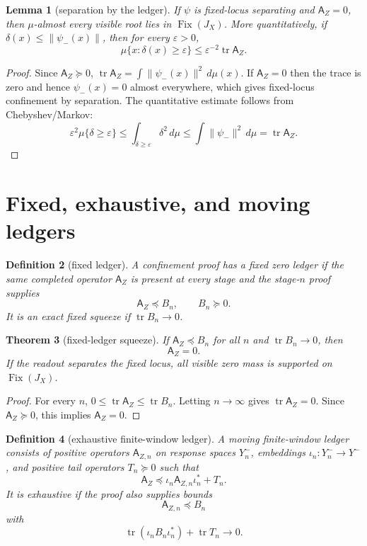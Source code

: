\documentclass[11pt]{article}
\newtheorem{theorem}{Theorem}[section]
\newtheorem{lemma}[theorem]{Lemma}
\newtheorem{definition}[theorem]{Definition}
\newcommand{\Tr}{\operatorname{tr}}
\newcommand{\Fix}{\operatorname{Fix}}
\begin{document}
\begin{lemma}[separation by the ledger]
If $\psi$ is fixed-locus separating and $\mathsf A_Z=0$, then $\mu$-almost every visible root lies in $\Fix(J_X)$. More quantitatively, if $\delta(x)\le\|\psi_-(x)\|$, then for every $\varepsilon>0$,
\[
        \mu\{x:\delta(x)\ge\varepsilon\}
        \le \varepsilon^{-2}\Tr\mathsf A_Z.
\]
\end{lemma}

\begin{proof}
Since $\mathsf A_Z\succeq0$, $\Tr\mathsf A_Z=\int\|\psi_-(x)\|^2\,d\mu(x)$.  If $\mathsf A_Z=0$ then the trace is zero and hence $\psi_-(x)=0$ almost everywhere, which gives fixed-locus confinement by separation.  The quantitative estimate follows from Chebyshev/Markov:
\[
\varepsilon^2\mu\{\delta\ge\varepsilon\}
\le \int_{\delta\ge\varepsilon}\delta^2\,d\mu
\le \int\|\psi_-\|^2\,d\mu=\Tr\mathsf A_Z.
\]
\end{proof}

\section{Fixed, exhaustive, and moving ledgers}

\begin{definition}[fixed ledger]
A confinement proof has a \emph{fixed zero ledger} if the same completed operator $\mathsf A_Z$ is present at every stage and the stage-$n$ proof supplies
\[
        \mathsf A_Z\preceq B_n,
        \qquad B_n\succeq0.
\]
It is an \emph{exact fixed squeeze} if $\Tr B_n\to0$.
\end{definition}

\begin{theorem}[fixed-ledger squeeze]
If $\mathsf A_Z\preceq B_n$ for all $n$ and $\Tr B_n\to0$, then
\[
        \mathsf A_Z=0.
\]
If the readout separates the fixed locus, all visible zero mass is supported on $\Fix(J_X)$.
\end{theorem}

\begin{proof}
For every $n$, $0\le\Tr \mathsf A_Z\le\Tr B_n$.  Letting $n\to\infty$ gives $\Tr\mathsf A_Z=0$.  Since $\mathsf A_Z\succeq0$, this implies $\mathsf A_Z=0$.
\end{proof}

\begin{definition}[exhaustive finite-window ledger]
A moving finite-window ledger consists of positive operators $\mathsf A_{Z,n}$ on response spaces $Y_n^-$, embeddings $\iota_n:Y_n^-\to Y^-$, and positive tail operators $T_n\succeq0$ such that
\[
        \mathsf A_Z
        \preceq \iota_n\mathsf A_{Z,n}\iota_n^*+T_n.
\]
It is exhaustive if the proof also supplies bounds
\[
        \mathsf A_{Z,n}\preceq B_n
\]
with
\[
        \Tr(\iota_nB_n\iota_n^*)+\Tr T_n\to0.
\]
\end{definition}
\end{document}
